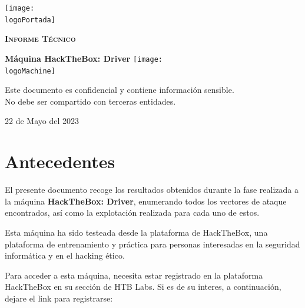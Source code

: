 \documentclass[a4paper]{article} %
\newcommand{\logoPortada}{/home/berserkwings/Escritorio/webServer/BerserkWings.github.io/assets/images/masthead.png} %
\newcommand{\machineName}{HackTheBox: Driver} %
\newcommand{\logoMachine}{/home/berserkwings/Escritorio/webServer/BerserkWings.github.io/assets/images/htb-writeup-driver/driver_logo.png}
\newcommand{\startDate}{22 de Mayo del 2023} %
\begin{document}
        \begin{titlepage} %
                \centering %
                \texttt{[image: \\logoPortada]}\par\vspace{1cm}
                {\scshape\LARGE \textbf{Informe Técnico}\par\vspace{0.6cm}}
                {\Huge\textcolor{bluePortada}{\textbf{Máquina \machineName}}}
                \vfill
                \texttt{[image: \\logoMachine]}
                \begin{tcolorbox}[colback=red!5!white,colframe=red!75!black] %
                        \centering
                        Este documento es confidencial y contiene información sensible.\\No debe ser compartido con terceras entidades.
                \end{tcolorbox}

                \vfill
                {\large \startDate\par}
                \vfill
        \end{titlepage} %


        \clearpage
        \tableofcontents %
        \clearpage


        \section{Antecedentes}
        El presente documento recoge los resultados obtenidos durante la fase realizada a la máquina \textbf{\machineName}, enumerando todos los vectores de ataque encontrados, así como la explotación realizada para cada uno de estos.

        Esta máquina ha sido testeada desde la plataforma de HackTheBox, una plataforma de entrenamiento y práctica para personas interesadas en la seguridad informática y en el hacking ético.

        Para acceder a esta máquina, necesita estar registrado en la plataforma HackTheBox en su sección de HTB Labs. Si es de su interes, a continuación, dejare el link para registrarse:
\end{document}
